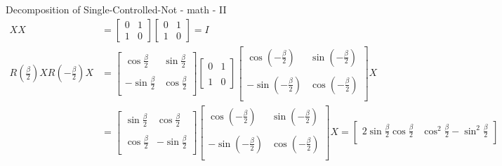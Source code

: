 \documentclass{beamer}
\begin{document}
\begin{frame}{Decomposition of Single-Controlled-Not - math - II}
  {\tiny
    \begin{align*}
      XX &=
      \begin{bmatrix} 0 & 1 \\ 1 & 0 \end{bmatrix} 
      \begin{bmatrix} 0 & 1 \\ 1 & 0 \end{bmatrix} 
      = I
      \\
      R(\frac{\beta}{2}) X R(-\frac{\beta}{2}) X
      &=
      \begin{bmatrix} 
        \cos \frac{\beta}{2} & \sin \frac{\beta}{2} \\
        \\
        -\sin \frac{\beta}{2} & \cos \frac{\beta}{2} \\
      \end{bmatrix} 
      \begin{bmatrix} 
        0 & 1 \\
        \\
        1 & 0
      \end{bmatrix} 
      \begin{bmatrix} 
        \cos (-\frac{\beta}{2}) & \sin (-\frac{\beta}{2}) \\
        \\
        -\sin (-\frac{\beta}{2}) & \cos (-\frac{\beta}{2}) \\
      \end{bmatrix}  X
      \\
      &=
      \begin{bmatrix} 
         \sin \frac{\beta}{2} & \cos \frac{\beta}{2}\\
        \\
         \cos \frac{\beta}{2} & -\sin \frac{\beta}{2} \\
      \end{bmatrix} 
      \begin{bmatrix} 
        \cos (-\frac{\beta}{2}) & \sin (-\frac{\beta}{2}) \\
        \\
        -\sin (-\frac{\beta}{2}) & \cos (-\frac{\beta}{2}) \\
      \end{bmatrix}
      X
      =
      \begin{bmatrix} 
        2 \sin \frac{\beta}{2} \cos \frac{\beta}{2} & \cos^2 \frac{\beta}{2} - \sin^2 \frac{\beta}{2} \\

\end{bmatrix}
\end{align*}}
\end{frame}
\end{document}
